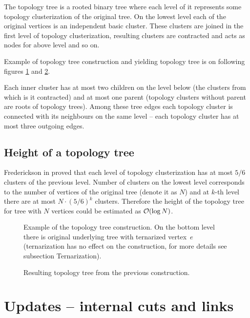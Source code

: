The {\I topology tree} is a rooted binary tree where each
level of it represents some topology clusterization of the original tree. On the
lowest level each of the original vertices is an independent basic cluster.
These clusters are joined in the first level of topology clusterization,
resulting clusters are contracted and acts as nodes for above level and so on.

Example of topology tree construction and yielding topology tree is on following
figures \ref{fig:topology_tree_construction} and \ref{fig:topology_tree_example}.

Each inner cluster has at most two children on the level below (the clusters
from which is it contracted) and at most one parent (topology clusters without
parent are roots of topology trees). Among these tree edges each topology
cluster is connected with its neighbours on the same level -- each topology
cluster has at most three outgoing edges.

\subsection{Height of a topology tree}

Frederickson in \cite{DSforDynamicallyMaintainingRootedTrees} proved that each
level of topology clusterization has at most $5/6$ clusters of the previous
level. Number of clusters on the lowest level corresponds to the number of
vertices of the original tree (denote it as $N$) and at $k$-th level there are
at most $N\cdot(5/6)^k$ clusters. Therefore the height of the topology tree for
tree with $N$ vertices could be estimated as ${\cal O}(\log N)$.

\begin{figure}[H]
\centering
{}
\caption[Example of the topology tree construction]
{Example of the topology tree construction. On the bottom level there is
original underlying tree with ternarized vertex $\,e$ (ternarization has no effect
on the construction, for more details see subsection Ternarization).}
\label{fig:topology_tree_construction}
\end{figure}

\begin{figure}[H]
\centering
{}
\caption{Resulting topology tree from the previous construction.}
\label{fig:topology_tree_example}
\end{figure}

\section{Updates -- internal cuts and links}

